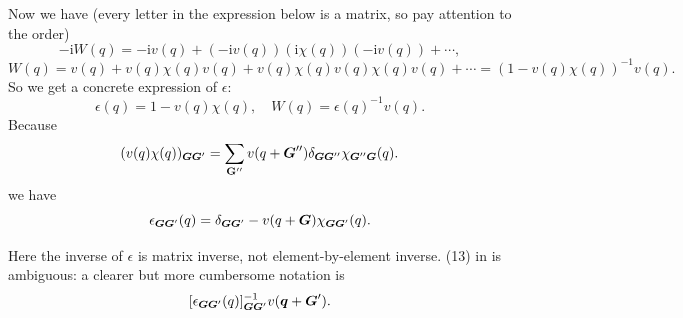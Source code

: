 \documentclass[hyperref, a4paper, 12pt]{report}
\newcommand*{\ii}{\mathrm{i}}
\begin{document}
Now we have (every letter in the expression below is a matrix,
so pay attention to the order)
\[
    - \ii W(q) = - \ii v(q) + (- \ii v(q)) (\ii \chi(q)) (- \ii v(q)) + \cdots ,
\]
\[
    W(q) = v(q) + v(q) \chi(q) v(q) + v(q) \chi(q) v(q) \chi(q) v(q) + \cdots
    = (1 - v(q) \chi(q))^{-1} v(q) .
\]
So we get a concrete expression of $\epsilon$: 
\begin{equation}
    \epsilon(q) = 1 - v(q) \chi(q), \quad W(q) = \epsilon(q)^{-1} v(q). 
\end{equation}
Because 
\[
    (v(q) \chi(q))_{\vb*{G} \vb*{G}'} 
    = \sum_{\vb{G}''} v(q + \vb*{G}'') \delta_{\vb*{G} \vb*{G}''} \chi_{\vb*{G}'' \vb*{G}}(q).
\]
we have
\begin{equation}
    \epsilon_{\vb*{G} \vb*{G}'}(q) 
    = \delta_{\vb*{G} \vb*{G}'} - v(q + \vb*{G}) \chi_{\vb*{G} \vb*{G}'}(q).
\end{equation}

Here the inverse of $\epsilon$ is matrix inverse, not element-by-element inverse.
(13) in \cite{berkeleygw} is ambiguous:
a clearer but more cumbersome notation is 
\[
    [\epsilon_{\vb*{G} \vb*{G}'}(q)]_{\vb*{G} \vb*{G}'}^{-1} v(\vb*{q} + \vb*{G}').
\]
\end{document}
